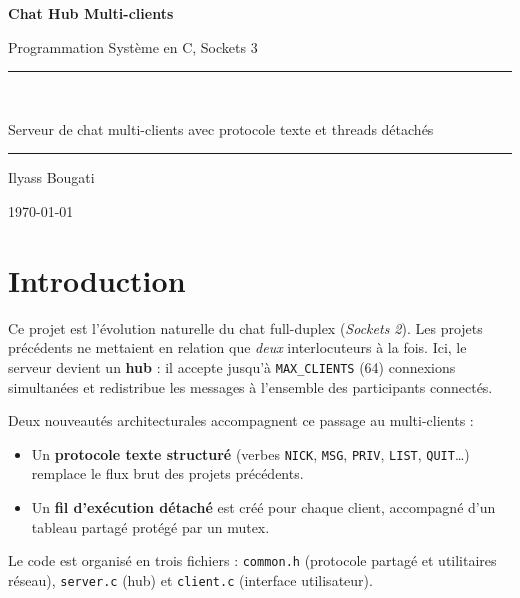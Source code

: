 \documentclass[12pt,a4paper]{article}
\begin{document}
\begin{titlepage}
    \centering
    \vspace*{2cm}
    {\Huge\bfseries Chat Hub Multi-clients\par}
    \vspace{0.5cm}
    {\Large Programmation Système en C, Sockets 3\par}
    \vspace{2cm}
    \rule{\linewidth}{0.4pt}\\[0.4cm]
    {\large Serveur de chat multi-clients avec protocole texte et threads détachés\par}
    \rule{\linewidth}{0.4pt}
    \vfill
    {\large Ilyass Bougati\par}
    \vspace{0.3cm}
    {\large \today\par}
\end{titlepage}

\tableofcontents
\newpage

\section{Introduction}

Ce projet est l'évolution naturelle du chat full-duplex (\emph{Sockets 2}).
Les projets précédents ne mettaient en relation que \emph{deux} interlocuteurs
à la fois. Ici, le serveur devient un \textbf{hub} : il accepte jusqu'à
\texttt{MAX\_CLIENTS} (64) connexions simultanées et redistribue les messages
à l'ensemble des participants connectés.

Deux nouveautés architecturales accompagnent ce passage au multi-clients :

\begin{itemize}
    \item Un \textbf{protocole texte structuré} (verbes \texttt{NICK},
          \texttt{MSG}, \texttt{PRIV}, \texttt{LIST}, \texttt{QUIT}\ldots)
          remplace le flux brut des projets précédents.
    \item Un \textbf{fil d'exécution détaché} est créé pour chaque client,
          accompagné d'un tableau partagé protégé par un mutex.
\end{itemize}

Le code est organisé en trois fichiers : \texttt{common.h} (protocole partagé
et utilitaires réseau), \texttt{server.c} (hub) et \texttt{client.c}
(interface utilisateur).
\end{document}
